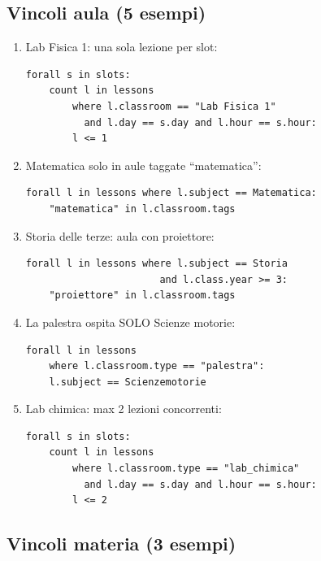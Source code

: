 \subsection{Vincoli aula (5 esempi)}

\begin{enumerate}
\item Lab Fisica 1: una sola lezione per slot:
\begin{lstlisting}
forall s in slots:
    count l in lessons
        where l.classroom == "Lab Fisica 1"
          and l.day == s.day and l.hour == s.hour:
        l <= 1
\end{lstlisting}

\item Matematica solo in aule taggate ``matematica'':
\begin{lstlisting}
forall l in lessons where l.subject == Matematica:
    "matematica" in l.classroom.tags
\end{lstlisting}

\item Storia delle terze: aula con proiettore:
\begin{lstlisting}
forall l in lessons where l.subject == Storia
                       and l.class.year >= 3:
    "proiettore" in l.classroom.tags
\end{lstlisting}

\item La palestra ospita SOLO Scienze motorie:
\begin{lstlisting}
forall l in lessons
    where l.classroom.type == "palestra":
    l.subject == Scienzemotorie
\end{lstlisting}

\item Lab chimica: max 2 lezioni concorrenti:
\begin{lstlisting}
forall s in slots:
    count l in lessons
        where l.classroom.type == "lab_chimica"
          and l.day == s.day and l.hour == s.hour:
        l <= 2
\end{lstlisting}
\end{enumerate}

\subsection{Vincoli materia (3 esempi)}

